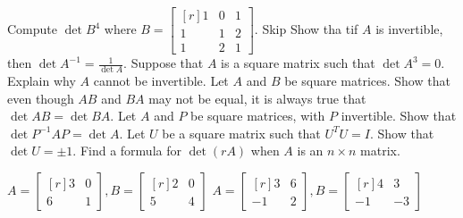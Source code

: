 \documentclass[11pt,answers]{exam} %
\newcommand{\mat}[1]{\begin{bmatrix*}[r] #1 \end{bmatrix*}}
\begin{document}
\begin{questions}
    \question Compute $\det{B^4}$ where $B = \mat{1 & 0 & 1 \\ 1 & 1 & 2 \\ 1 & 2 & 1}$.
    \question Skip
    \question Show tha tif $A$ is invertible, then $\det{A^{-1}} = \frac{1}{\det{A}}$.
    \question Suppose that $A$ is a square matrix such that $\det{A^3} = 0$. Explain why $A$ cannot be invertible.
    \question Let $A$ and $B$ be square matrices. Show that even though $AB$ and $BA$ may not be equal, it is always true that $\det{AB} = \det{BA}$.
    \question Let $A$ and $P$ be square matrices, with $P$ invertible. Show that $\det{P^{-1}AP} = \det{A}$.
    \question Let $U$ be a square matrix such that $U^T U = I$. Show that $\det{U} = \pm 1$.
    \question Find a formula for $\det{(rA)}$ when $A$ is an $n \times n$ matrix.

    \question $A = \mat{3 & 0 \\ 6 & 1}, B= \mat{2 & 0 \\ 5 & 4}$
    \question $A = \mat{3 & 6 \\ -1 & 2}, B = \mat{4 & 3 \\ -1 & -3}$
    


\end{questions}
\end{document}
